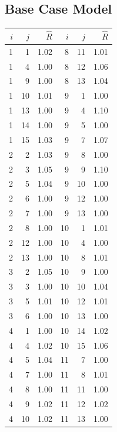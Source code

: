 \subsection{Base Case Model}
\begin{table}
 \centering
 \label{tab:aadh_base_case_rhat}
 \begin{tabular}{|r|r|r||r|r|r|}
 \hline
 $i$ & $j$ & $\hat{R}$ & $i$ & $j$ & $\hat{R}$ \\
 \hline\hline
 1 & 1 & 1.02 & 8 & 11 & 1.01 \\
 1 & 4 & 1.00 & 8 & 12 & 1.06 \\
 1 & 9 & 1.00 & 8 & 13 & 1.04 \\
 1 & 10 & 1.01 & 9 & 1 & 1.00 \\
 1 & 13 & 1.00 & 9 & 4 & 1.10 \\
 1 & 14 & 1.00 & 9 & 5 & 1.00 \\
 1 & 15 & 1.03 & 9 & 7 & 1.07 \\
 2 & 2 & 1.03 & 9 & 8 & 1.00 \\
 2 & 3 & 1.05 & 9 & 9 & 1.10 \\
 2 & 5 & 1.04 & 9 & 10 & 1.00 \\
 2 & 6 & 1.00 & 9 & 12 & 1.00 \\
 2 & 7 & 1.00 & 9 & 13 & 1.00 \\
 2 & 8 & 1.00 & 10 & 1 & 1.01 \\
 2 & 12 & 1.00 & 10 & 4 & 1.00 \\
 2 & 13 & 1.00 & 10 & 8 & 1.01 \\
 3 & 2 & 1.05 & 10 & 9 & 1.00 \\
 3 & 3 & 1.00 & 10 & 10 & 1.04 \\
 3 & 5 & 1.01 & 10 & 12 & 1.01 \\
 3 & 6 & 1.00 & 10 & 13 & 1.00 \\
 4 & 1 & 1.00 & 10 & 14 & 1.02 \\
 4 & 4 & 1.02 & 10 & 15 & 1.06 \\
 4 & 5 & 1.04 & 11 & 7 & 1.00 \\
 4 & 7 & 1.00 & 11 & 8 & 1.01 \\
 4 & 8 & 1.00 & 11 & 11 & 1.00 \\
 4 & 9 & 1.02 & 11 & 12 & 1.02 \\
 4 & 10 & 1.02 & 11 & 13 & 1.00 \\

\end{tabular}
\end{table}
